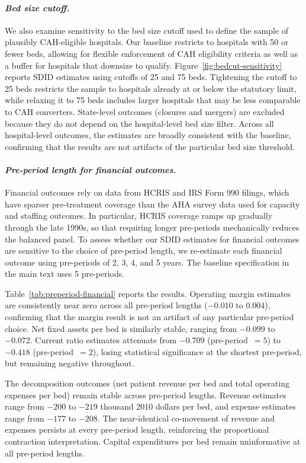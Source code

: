 \documentclass[a4paper, 12pt]{article}
\begin{document}
\paragraph{\textit{Bed size cutoff.}}
We also examine sensitivity to the bed size cutoff used to define the sample of plausibly CAH-eligible hospitals. Our baseline restricts to hospitals with 50 or fewer beds, allowing for flexible enforcement of CAH eligibility criteria as well as a buffer for hospitals that downsize to qualify. Figure~\ref{fig:bedcut-sensitivity} reports SDID estimates using cutoffs of 25 and 75 beds. Tightening the cutoff to 25 beds restricts the sample to hospitals already at or below the statutory limit, while relaxing it to 75 beds includes larger hospitals that may be less comparable to CAH converters. State-level outcomes (closures and mergers) are excluded because they do not depend on the hospital-level bed size filter. Across all hospital-level outcomes, the estimates are broadly consistent with the baseline, confirming that the results are not artifacts of the particular bed size threshold.

\paragraph{\textit{Pre-period length for financial outcomes.}}
Financial outcomes rely on data from HCRIS and IRS Form 990 filings, which have sparser pre-treatment coverage than the AHA survey data used for capacity and staffing outcomes. In particular, HCRIS coverage ramps up gradually through the late 1990s, so that requiring longer pre-periods mechanically reduces the balanced panel. To assess whether our SDID estimates for financial outcomes are sensitive to the choice of pre-period length, we re-estimate each financial outcome using pre-periods of 2, 3, 4, and 5 years. The baseline specification in the main text uses 5 pre-periods.

Table~\ref{tab:preperiod-financial} reports the results. Operating margin estimates are consistently near zero across all pre-period lengths ($-0.010$ to $0.004$), confirming that the margin result is not an artifact of any particular pre-period choice. Net fixed assets per bed is similarly stable, ranging from $-0.099$ to $-0.072$. Current ratio estimates attenuate from $-0.709$ (pre-period~$=5$) to $-0.418$ (pre-period~$=2$), losing statistical significance at the shortest pre-period, but remaining negative throughout.

The decomposition outcomes (net patient revenue per bed and total operating expenses per bed) remain stable across pre-period lengths. Revenue estimates range from $-200$ to $-219$ thousand 2010 dollars per bed, and expense estimates range from $-177$ to $-208$. The near-identical co-movement of revenue and expenses persists at every pre-period length, reinforcing the proportional contraction interpretation. Capital expenditures per bed remain uninformative at all pre-period lengths.
\end{document}
